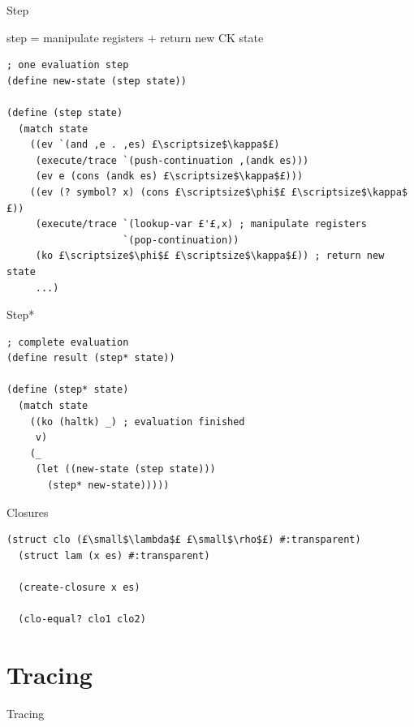 \documentclass{beamer}
\begin{document}
\begin{frame}[fragile]{Step}

step = manipulate registers + return new CK state

\begin{lstlisting}[basicstyle = \scriptsize\ttfamily, escapechar = £]
; one evaluation step
(define new-state (step state)) 

(define (step state)
  (match state
    ((ev `(and ,e . ,es) £\scriptsize$\kappa$£)
     (execute/trace `(push-continuation ,(andk es)))
     (ev e (cons (andk es) £\scriptsize$\kappa$£)))
    ((ev (? symbol? x) (cons £\scriptsize$\phi$£ £\scriptsize$\kappa$£))
     (execute/trace `(lookup-var £'£,x) ; manipulate registers
                    `(pop-continuation))
     (ko £\scriptsize$\phi$£ £\scriptsize$\kappa$£)) ; return new state
     ...)
\end{lstlisting}

\end{frame}

\begin{frame}[fragile]{Step*}

\begin{lstlisting}[basicstyle = \small\ttfamily, escapechar = £]
; complete evaluation
(define result (step* state))

(define (step* state)
  (match state
    ((ko (haltk) _) ; evaluation finished
     v)
    (_
     (let ((new-state (step state)))
       (step* new-state)))))
\end{lstlisting}

\end{frame}

\begin{frame}[fragile]{Closures}

\begin{lstlisting}[basicstyle = \small\ttfamily, escapechar = £]
  (struct clo (£\small$\lambda$£ £\small$\rho$£) #:transparent)
  (struct lam (x es) #:transparent)
  
  (create-closure x es)
  
  (clo-equal? clo1 clo2)
\end{lstlisting}

\end{frame}

\section{Tracing}

\begin{frame}
\centering
\Huge{Tracing}
\end{frame}
\end{document}
